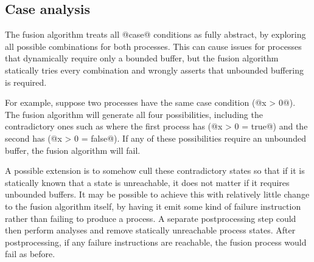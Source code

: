 % 
% 

\subsection{Case analysis}
\label{s:FullyAbstractCase}

The fusion algorithm treats all @case@ conditions as fully abstract, by exploring all possible combinations for both processes.
This can cause issues for processes that dynamically require only a bounded buffer, but the fusion algorithm statically tries every combination and wrongly asserts that unbounded buffering is required.

For example, suppose two processes have the same case condition (@x > 0@).
The fusion algorithm will generate all four possibilities, including the contradictory ones such as where the first process has (@x > 0 = true@) and the second has (@x > 0 = false@).
If any of these possibilities require an unbounded buffer, the fusion algorithm will fail.

A possible extension is to somehow cull these contradictory states so that if it is statically known that a state is unreachable, it does not matter if it requires unbounded buffers.
It may be possible to achieve this with relatively little change to the fusion algorithm itself, by having it emit some kind of failure instruction rather than failing to produce a process.
A separate postprocessing step could then perform analyses and remove statically unreachable process states.
After postprocessing, if any failure instructions are reachable, the fusion process would fail as before.


